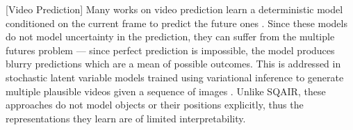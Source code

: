 	
	
	[Video Prediction]
	Many works on video prediction learn a deterministic model conditioned on the current frame to predict the future ones \citep{Ranzato2014video,Srivastava2015unsupervised}.
	Since these models do not model uncertainty in the prediction, they can suffer from the multiple futures problem --- since perfect prediction is impossible, the model produces blurry predictions which are a mean of possible outcomes.
	This is addressed in stochastic latent variable models trained using variational inference to generate multiple plausible videos given a sequence of images \citep{Babaeizadeh2017stochastic, Denton2018stochastic}.
	Unlike \gls{SQAIR}, these approaches do not model objects or their positions explicitly, thus the representations they learn are of limited interpretability. 
	


